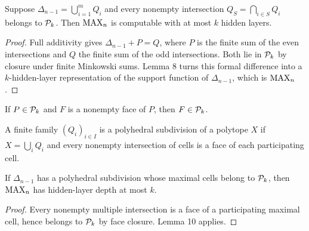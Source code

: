 \begin{lemma}
  \label{lem:cover-depth-bound}
  Suppose $\Delta_{n-1}=\bigcup_{i=1}^mQ_i$ and every nonempty intersection
  $Q_S=\bigcap_{i\in S}Q_i$ belongs to $\mathcal{P}_k$.  Then $\operatorname{MAX}_n$ is
  computable with at most $k$ hidden layers.
\end{lemma}
\begin{proof}
  Full additivity gives $\Delta_{n-1}+P=Q$, where $P$ is the finite sum of the
  even intersections and $Q$ the finite sum of the odd intersections.  Both
  lie in $\mathcal{P}_k$ by closure under finite Minkowski sums.  Lemma 8 turns this
  formal difference into a $k$-hidden-layer representation of the support
  function of $\Delta_{n-1}$, which is $\operatorname{MAX}_n$.
\end{proof}

\begin{lemma}
  \label{lem:polytope-class-face-closed}
  \notready
  If $P\in\mathcal{P}_k$ and $F$ is a nonempty face of $P$, then
  $F\in\mathcal{P}_k$.
\end{lemma}

\begin{definition}
  \label{def:polyhedral-subdivision}
  A finite family $(Q_i)_{i\in I}$ is a polyhedral subdivision of a polytope
  $X$ if $X=\bigcup_iQ_i$ and every nonempty intersection of cells is a face
  of each participating cell.
\end{definition}

\begin{corollary}
  \label{cor:subdivision-depth-bound}
  If $\Delta_{n-1}$ has a polyhedral subdivision whose maximal cells belong to
  $\mathcal{P}_k$, then $\operatorname{MAX}_n$ has hidden-layer depth at most $k$.
\end{corollary}
\begin{proof}
  Every nonempty multiple intersection is a face of a participating maximal
  cell, hence belongs to $\mathcal{P}_k$ by face closure.  Lemma 10 applies.
\end{proof}

